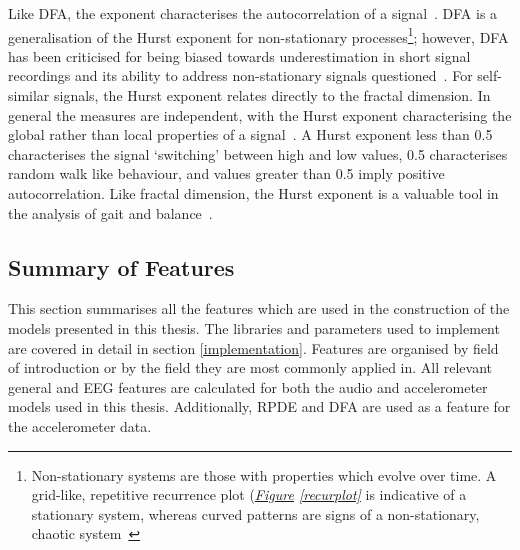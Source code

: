 \documentclass[12pt, twoside]{book}
\renewcommand\emph[1]{\textit{\color{USred}{#1}}}
\begin{document}
Like DFA, the \emph{Hurst} exponent characterises the autocorrelation of a signal~\cite{hurst1965long}. DFA is a generalisation of the Hurst exponent for non-stationary processes\footnote{Non-stationary systems are those with properties which evolve over time. A grid-like, repetitive recurrence plot (\textit{\hyperref[recurplot]{Figure} \ref{recurplot}} is indicative of a stationary system, whereas curved patterns are signs of a non-stationary, chaotic system~\cite{facchini2005recurrence}}; however, DFA has been criticised for being biased towards underestimation in short signal recordings and its ability to address non-stationary signals questioned~\cite{revistDFA}. For self-similar signals, the Hurst exponent relates directly to the fractal dimension. In general the measures are independent, with the Hurst exponent characterising the global rather than local properties of a signal~\cite{hurstfractal}. A Hurst exponent less than 0.5 characterises the signal `switching' between high and low values, 0.5 characterises random walk like behaviour, and values greater than 0.5 imply positive autocorrelation. Like fractal dimension, the Hurst exponent is a valuable tool in the analysis of gait and balance~\cite{duarte2000fractal}. 



\subsection{Summary of Features}
This section summarises all the features which are used in the construction of the models presented in this thesis. The libraries and parameters used to implement are covered in detail in section \ref{implementation}. Features are organised by field of introduction or by the field they are most commonly applied in. All relevant general and EEG features are calculated for both the audio and accelerometer models used in this thesis. Additionally, RPDE and DFA are used as a feature for the accelerometer data.
\end{document}
